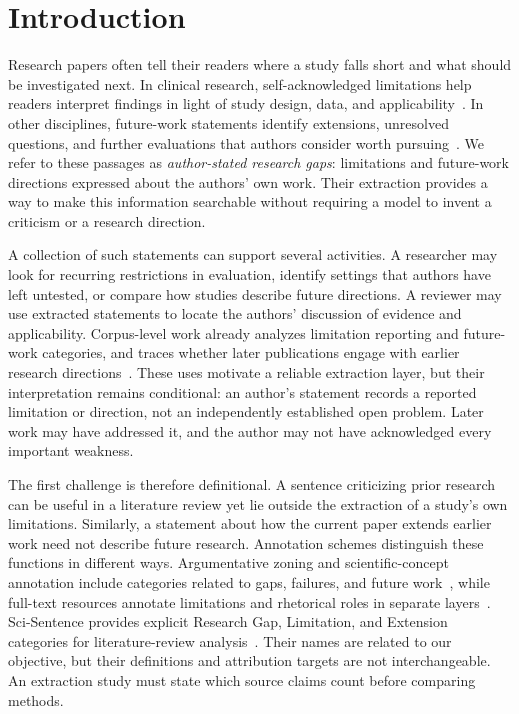 \section{Introduction}
\label{sec:introduction}

Research papers often tell their readers where a study falls short and what should be investigated
next. In clinical research, self-acknowledged limitations help readers interpret findings in light
of study design, data, and applicability~\citep{kilicoglu2018automatic}. In other disciplines,
future-work statements identify extensions, unresolved questions, and further evaluations that
authors consider worth pursuing~\citep{zhu2019recognizing,zhang2023fws}. We refer to these passages
as \emph{author-stated research gaps}: limitations and future-work directions expressed about the
authors' own work. Their extraction provides a way to make this information searchable without
requiring a model to invent a criticism or a research direction.

A collection of such statements can support several activities. A researcher may look for
recurring restrictions in evaluation, identify settings that authors have left untested, or
compare how studies describe future directions. A reviewer may use extracted statements to
locate the authors' discussion of evidence and applicability. Corpus-level work already analyzes
limitation reporting and future-work categories, and traces whether later publications engage
with earlier research directions~\citep{lan2024automatic,hao2020acl,suray2024future}. These uses
motivate a reliable extraction layer, but their interpretation remains conditional: an author's
statement records a reported limitation or direction, not an independently established open
problem. Later work may have addressed it, and the author may not have acknowledged every
important weakness.

The first challenge is therefore definitional. A sentence criticizing prior research can be
useful in a literature review yet lie outside the extraction of a study's own limitations.
Similarly, a statement about how the current paper extends earlier work need not describe
future research. Annotation schemes distinguish these functions in different ways. Argumentative
zoning and scientific-concept annotation include categories related to gaps, failures, and future
work~\citep{liakata2010corpora}, while full-text resources annotate limitations and rhetorical
roles in separate layers~\citep{fisas2016multilayered}. Sci-Sentence provides explicit
Research Gap, Limitation, and Extension categories for literature-review analysis~\citep{bolanos2025scisentence}.
Their names are related to our objective, but their definitions and attribution targets are not
interchangeable. An extraction study must state which source claims count before comparing methods.

